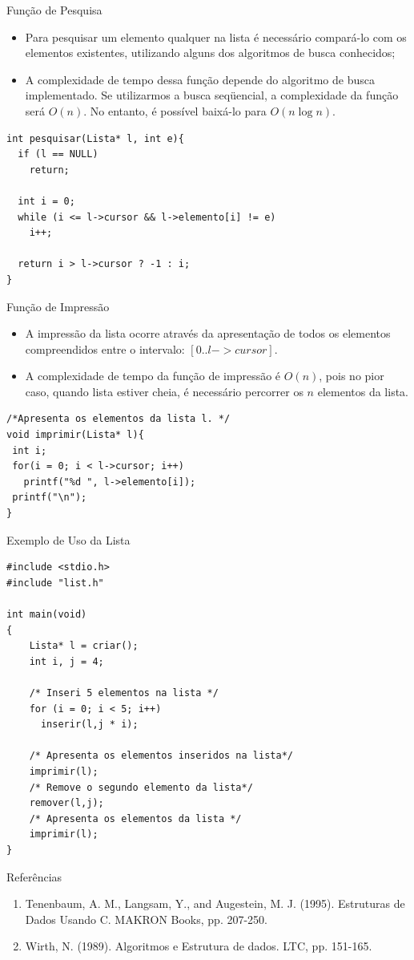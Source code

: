 \begin{frame}[fragile]{Função de Pesquisa} 
	\begin{itemize}
		\item Para pesquisar um elemento qualquer na lista é necessário compará-lo com os elementos existentes, utilizando alguns dos algoritmos de busca conhecidos;
		\item A complexidade de tempo dessa função depende do algoritmo de busca implementado. Se utilizarmos a busca seqüencial, a complexidade da função será $O(n)$. No entanto, é possível baixá-lo para $O(n\log n)$.
	\end{itemize}

\footnotesize
\begin{lstlisting}
int pesquisar(Lista* l, int e){
  if (l == NULL)
    return;
  
  int i = 0;
  while (i <= l->cursor && l->elemento[i] != e)
    i++;
        
  return i > l->cursor ? -1 : i;
}
\end{lstlisting}
\end{frame}

\begin{frame}[fragile]{Função de Impressão}
\begin{itemize}
		\item A impressão da lista ocorre através da apresentação de todos os elementos compreendidos entre o intervalo: $[0.. l->cursor]$.
		\item A complexidade de tempo da função de impressão é $O(n)$, pois no pior caso, quando lista estiver cheia, é necessário percorrer os $n$ elementos da lista.
	\end{itemize}
	
\begin{lstlisting}
/*Apresenta os elementos da lista l. */
void imprimir(Lista* l){
 int i;
 for(i = 0; i < l->cursor; i++)
   printf("%d ", l->elemento[i]);
 printf("\n");  
}
\end{lstlisting}	
\end{frame}

\begin{frame}[fragile]{Exemplo de Uso da Lista}
\footnotesize
\begin{lstlisting}
#include <stdio.h>
#include "list.h"

int main(void)
{
    Lista* l = criar();
    int i, j = 4;
    
    /* Inseri 5 elementos na lista */
    for (i = 0; i < 5; i++)
      inserir(l,j * i);
    
    /* Apresenta os elementos inseridos na lista*/    
    imprimir(l);
    /* Remove o segundo elemento da lista*/
    remover(l,j);
    /* Apresenta os elementos da lista */    
    imprimir(l);        
}
\end{lstlisting}
\end{frame} 


\begin{frame}{Referências}
	\begin{enumerate}
		\item Tenenbaum, A. M., Langsam, Y., and Augestein, M. J. (1995). Estruturas de Dados Usando C. MAKRON Books, pp. 207-250.
		\item Wirth, N. (1989). Algoritmos e Estrutura de dados. LTC, pp. 151-165.
	\end{enumerate}
\end{frame}

